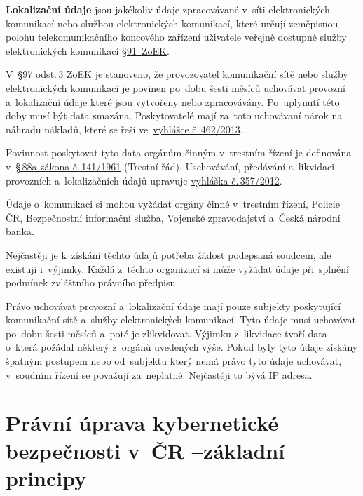 \textbf{Lokalizační údaje} jsou jakékoliv údaje zpracovávané v~síti elektronických komunikací nebo službou elektronických komunikací, které určují zeměpisnou polohu telekomunikačního koncového zařízení uživatele veřejně dostupné služby elektronických komunikací \href{https://www.zakonyprolidi.cz/cs/2005-127#p91-1}{§91~ZoEK}.

V~\href{https://www.zakonyprolidi.cz/cs/2005-127#p97-3}{§97 odst.\,3 ZoEK} je stanoveno, že provozovatel komunikační sítě nebo služby elektronických komunikací je povinen po~dobu šesti měsíců uchovávat provozní a~lokalizační údaje které jsou vytvořeny nebo zpracovávány. Po~uplynutí této doby musí být data smazána. Poskytovatelé mají za~toto uchovávaní nárok na náhradu nákladů, které se řeší ve~\href{https://www.zakonyprolidi.cz/cs/2013-462/zneni-20140101}{vyhlášce č.\,462/2013}.

Povinnost poskytovat tyto data orgánům činným v~trestním řízení je definována v~\href{https://www.zakonyprolidi.cz/cs/1961-141#p88a}{§\,88a zákona č.\,141/1961} (Trestní řád). Uschovávání, předávání a~likvidaci provozních a~lokalizačních údajů upravuje \href{https://www.zakonyprolidi.cz/cs/2012-357}{vyhláška č.\,357/2012}.

Údaje o~komunikaci si mohou vyžádat orgány činné v~trestním řízení, Policie ČR, Bezpečnostní informační služba, Vojenské zpravodajství a~Česká národní banka.

Nejčastěji je k~získání těchto údajů potřeba žádost podepsaná soudcem, ale existují i~výjimky. Každá z~těchto organizací si může vyžádat údaje při~splnění podmínek zvláštního právního předpisu.

Právo uchovávat provozní a~lokalizační údaje mají pouze subjekty poskytující komunikační sítě a~služby elektronických komunikací. Tyto údaje musí uchovávat po~dobu šesti měsíců a~poté je zlikvidovat. Výjimku z~likvidace tvoří data o~která požádal některý z~orgánů uvedených výše. Pokud byly tyto údaje získány špatným postupem nebo od~subjektu který nemá právo tyto údaje uchovávat, v~soudním řízení se považují za~neplatné. Nejčastěji to bývá IP adresa.


















\clearpage
\section[Právní úprava kybernetické bezpečnosti v ČR -- základní principy]{Právní úprava kybernetické bezpečnosti v~ČR --\newline základní principy}

